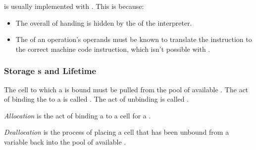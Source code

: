 \begin{remark*}
     is usually implemented with .
  This is because:
  \begin{itemize}[noitemsep]
  \item The overall  of  handing is hidden by the  of the interpreter.
  \item The  of an operation's operands must be known to translate the instruction to the correct machine code instruction, which isn't possible with   .
  \end{itemize}
\end{remark*}

\subsubsection{Storage s and Lifetime}\label{subsubsec:Storage_Bindings_and_Lifetime}
The  cell to which a  is bound must be pulled from the pool of available .
The act of binding the  to a  is called .
The act of unbinding is called .

\begin{definition}[Allocation]\label{def:Variable_Memory_Allocation}
  \emph{Allocation} is the act of binding a  to a  cell for a .
\end{definition}

\begin{definition}[Deallocation]\label{def:Variable_Memory_Deallocation}
  \emph{Deallocation} is the process of placing a  cell that has been unbound from a variable back into the pool of available .
\end{definition}


